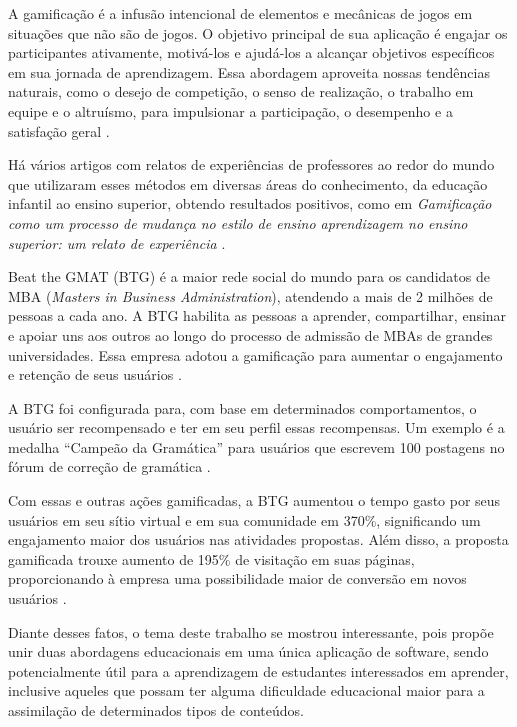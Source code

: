 A gamificação é a infusão intencional de elementos e mecânicas de jogos em situações que não são de jogos. O objetivo principal de sua aplicação é engajar os participantes ativamente, motivá-los e ajudá-los a alcançar objetivos específicos em sua jornada de aprendizagem. Essa abordagem aproveita nossas tendências naturais, como o desejo de competição, o senso de realização, o trabalho em equipe e o altruísmo, para impulsionar a participação, o desempenho e a satisfação geral \cite{magtani2024design}.

Há vários artigos com relatos de experiências de professores ao redor do mundo que utilizaram esses métodos em diversas áreas do conhecimento, da educação infantil ao ensino superior, obtendo resultados positivos, como em  \textit{Gamificação como um processo de mudança no estilo de ensino aprendizagem no ensino superior: um relato de experiência} \cite{fragelli2017game}.

Beat the GMAT (BTG) é a maior rede social do mundo para os candidatos de MBA (\textit{Masters in Business Administration}), atendendo a mais de 2 milhões de pessoas a cada ano. A BTG habilita as pessoas a aprender, compartilhar, ensinar e apoiar uns aos outros ao longo do processo de admissão de MBAs de grandes universidades. Essa empresa adotou a gamificação para aumentar o engajamento e retenção de seus usuários \cite{tolomei2017gamificaccao}.

A BTG foi configurada para, com base em determinados comportamentos, o usuário ser recompensado e ter em seu perfil essas recompensas. Um exemplo é a medalha ``Campeão da Gramática'' para usuários que escrevem 100 postagens no fórum de correção de gramática \cite{tolomei2017gamificaccao}.

Com essas e outras ações gamificadas, a BTG aumentou o tempo gasto por seus usuários em seu sítio virtual e em sua comunidade em 370\%, significando um engajamento maior dos usuários nas atividades propostas. Além disso, a proposta gamificada trouxe aumento de 195\% de visitação em suas páginas, proporcionando à empresa uma possibilidade maior de conversão em novos usuários \cite{tolomei2017gamificaccao}.

Diante desses fatos, o tema deste trabalho se mostrou interessante, pois propõe unir duas abordagens educacionais em uma única aplicação de software, sendo potencialmente útil para a aprendizagem de estudantes interessados em aprender, inclusive aqueles que possam ter alguma dificuldade educacional maior para a assimilação de determinados tipos de conteúdos.

